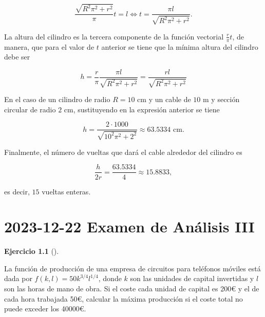 \documentclass[
  spanish,
  a4paper,
]{scrreport}
\theoremstyle{definition}
\newtheorem{exercise}{Ejercicio}[chapter]
\theoremstyle{remark}
\begin{document}
\begin{tcolorbox}
\[
\frac{\sqrt{R^2\pi^2+r^2}}{\pi}t = l \Leftrightarrow t = \frac{\pi l}{\sqrt{R^2\pi^2+r^2}}.
\]

La altura del cilindro es la tercera componente de la función vectorial
\(\frac{r}{\pi}t\), de manera, que para el valor de \(t\) anterior se
tiene que la mínima altura del cilindro debe ser

\[
h=\frac{r}{\pi}\frac{\pi l}{\sqrt{R^2\pi^2+r^2}} = \frac{rl}{\sqrt{R^2\pi^2+r^2}} 
\]

En el caso de un cilindro de radio \(R=10\) cm y un cable de \(10\) m y
sección circular de radio \(2\) cm, sustituyendo en la expresión
anterior se tiene

\[
h=\frac{2\cdot 1000}{\sqrt{10^2\pi^2+2^2}} \approx 63.5334 \mbox{ cm}.
\]

Finalmente, el número de vueltas que dará el cable alrededor del
cilindro es

\[
\frac{h}{2r} = \frac{63.5334}{4}
\approx 15.8833,
\]

es decir, \(15\) vueltas enteras.

\end{tcolorbox}


\chapter{\texorpdfstring{2023-12-22 Examen de Análisis
III}{2023-12-22  Examen de Análisis III}}\label{examen-de-anuxe1lisis-iii-1}

\begin{exercise}[]\protect\hypertarget{exr-1}{}\label{exr-1}

La función de producción de una empresa de circuitos para teléfonos
móviles está dada por \(f(k,l) = 50k^{3/4}l^{1/4}\), donde \(k\) son las
unidades de capital invertidas y \(l\) son las horas de mano de obra. Si
el coste cada unidad de capital es 200€ y el de cada hora trabajada 50€,
calcular la máxima producción si el coste total no puede exceder los
40000€.

\end{exercise}
\end{document}
